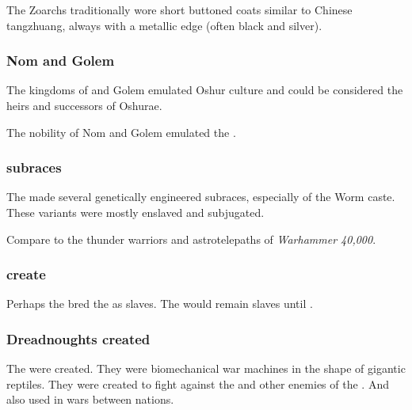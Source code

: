 The Zoarchs traditionally wore short buttoned coats similar to Chinese tangzhuang, always with a metallic edge (often black and silver). 




\subsubsection{Nom and Golem}
The kingdoms of  and Golem emulated Oshur culture and could be considered the heirs and successors of Oshurae. 

The nobility of Nom and Golem emulated the . 







\subsubsection{\Ophidian subraces}
The \caisith made several genetically engineered subraces, especially of the Worm caste.
These \caisith variants were mostly enslaved and subjugated. 

Compare to the thunder warriors and astrotelepaths of \emph{Warhammer 40,000}. 





\subsubsection{\Ophidians create \nephilim}
Perhaps the \ophidians bred the \nephilim as slaves.
The \nephilim would remain slaves until . 





\subsubsection{Dreadnoughts created}
The  were created. 
They were biomechanical war machines in the shape of gigantic reptiles. 
They were created to fight against the \vorcanths and other enemies of the \ophidians.
And also used in wars between \ophidian nations. 















